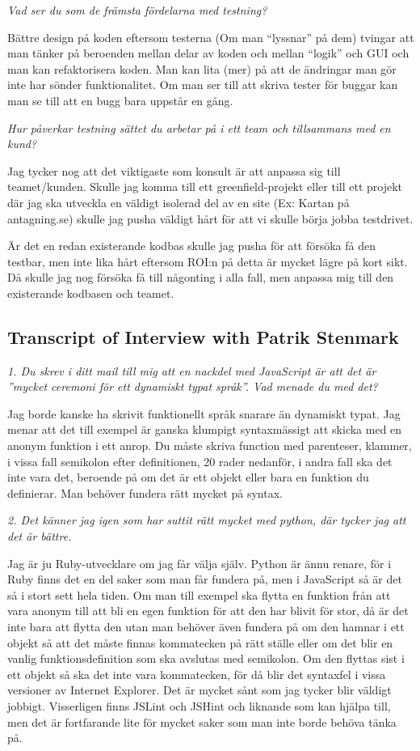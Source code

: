 \documentclass[11pt]{article}
\begin{document}
\emph{Vad ser du som de främsta fördelarna med testning?}

Bättre design på koden eftersom testerna (Om man ``lyssnar'' på dem) tvingar
att man tänker på beroenden mellan delar av koden och mellan ``logik'' och
GUI och man kan refaktorisera koden. Man kan lita (mer) på att de
ändringar man gör inte har sönder funktionalitet. Om man ser till att
skriva tester för buggar kan man se till att en bugg bara uppstår en gång.

\emph{Hur påverkar testning sättet du arbetar på i ett team och tillsammans
med en kund?}

Jag tycker nog att det viktigaste som konsult är att anpassa sig till
teamet/kunden. Skulle jag komma till ett greenfield-projekt eller till ett
projekt där jag ska utveckla en väldigt isolerad del av en site (Ex:
Kartan på antagning.se) skulle jag pusha väldigt hårt för att vi skulle
börja jobba testdrivet.

Är det en redan existerande kodbas skulle jag pusha för att försöka få den
testbar, men inte lika hårt eftersom ROI:n på detta är mycket lägre på
kort sikt. Då skulle jag nog försöka få till någonting i alla fall, men
anpassa mig till den existerande kodbasen och teamet.

\subsection*{Transcript of Interview with Patrik Stenmark}

\emph{1. Du skrev i ditt mail till mig att en nackdel med JavaScript är att det är ”mycket ceremoni för ett dynamiskt typat språk”. Vad menade du med det?}

Jag borde kanske ha skrivit funktionellt språk snarare än dynamiskt typat. Jag menar att det till exempel är ganska klumpigt syntaxmässigt att skicka med en anonym funktion i ett anrop. Du måste skriva function med parenteser, klammer, i vissa fall semikolon efter definitionen, 20 rader nedanför, i andra fall ska det inte vara det, beroende på om det är ett objekt eller bara en funktion du definierar. Man behöver fundera rätt mycket på syntax.

\emph{2. Det känner jag igen som har suttit rätt mycket med python, där tycker jag att det är bättre.}

Jag är ju Ruby-utvecklare om jag får välja själv. Python är ännu renare, för i Ruby finns det en del saker som man får fundera på, men i JavaScript så är det så i stort sett hela tiden. Om man till exempel ska flytta en funktion från att vara anonym till att bli en egen funktion för att den har blivit för stor, då är det inte bara att flytta den utan man behöver även fundera på om den hamnar i ett objekt så att det måste finnas kommatecken på rätt ställe eller om det blir en vanlig funktionsdefinition som ska avslutas med semikolon. Om den flyttas sist i ett objekt så ska det inte vara kommatecken, för då blir det syntaxfel i vissa versioner av Internet Explorer. Det är mycket sånt som jag tycker blir väldigt jobbigt. Visserligen finns JSLint och JSHint och liknande som kan hjälpa till, men det är fortfarande lite för mycket saker som man inte borde behöva tänka på.
\end{document}
